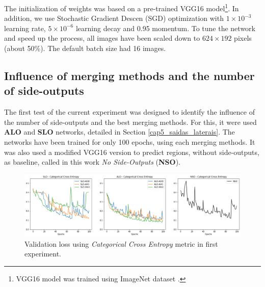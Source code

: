 The initialization of weights was based on a pre-trained VGG16 model\footnote{VGG16 model was trained using ImageNet dataset \cite{ILSVRC15}.}.
In addition, we use Stochastic Gradient Descen (SGD) optimization with $1 \times 10^{-3}$ learning rate, $5 \times 10^{-6}$ learning decay and 0.95 momentum.
To tune the network and speed up the process, all images have been scaled down to $624 \times 192$ pixels (about 50\%). 
The default batch size had 16 images.

\subsection{Influence of merging methods and the number of side-outputs}
\label{cap6_experm_1_qtd_saidas}

The first test of the current experiment was designed to identify the influence of the number of side-outputs and the best merging methods.
For this, it were used \textbf{ALO} and \textbf{SLO} networks, detailed in Section \ref{cap5_saidas_laterais}.
The networks have been trained for only 100 epochs, using each merging methods.
It was also used a modified VGG16 version to predict regions, without side-outputs, as baseline, called in this work \textit{No Side-Outputs} (\textbf{NSO}).


\begin{figure}
  \centering
  \includegraphics[width=1\textwidth]{../imagens/visualiz_dados/kitti_alo-slo-nso_training.png} %
  \caption{Validation loss using \textit{Categorical Cross Entropy} metric in first experiment.}
  \label{fig:kitti_validation_loss_100epochs}
\end{figure}

